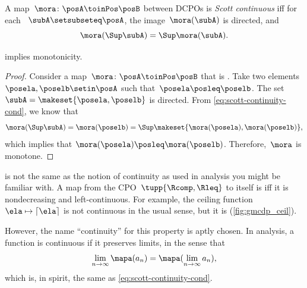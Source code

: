 \begin{ctdefinition}
    \label{def:scott-continuity}
    A map~$\mora\colon\posA\toinPos\posB$ between DCPOs is \emph{Scott continuous} iff for each ~$\subA\setsubseteq\posA$, the image~$\mora(\subA)$ is directed, and
    \begin{equation}
        \label{eq:scott-continuity-cond}
        \mora(\Sup \subA)=\Sup \mora(\subA).
    \end{equation}
\end{ctdefinition}
\begin{lemma}
     implies monotonicity.
\end{lemma}
\begin{proof}
    Consider a map~$\mora\colon\posA\toinPos\posB$ that is .
    Take two elements~$\posela, \poselb \setin \posA$ such that~$\posela\posleq\poselb$.
    The set~$ \subA = \makeset{\posela, \poselb}$ is directed.
    From \cref{eq:scott-continuity-cond}, we know that
    \begin{equation}
        \mora(\Sup \subA) = \mora(\poselb) = \Sup \makeset{\mora(\posela), \mora(\poselb)},
    \end{equation}
    which implies that $\mora(\posela) \posleq \mora(\poselb)$.
    Therefore,~$\mora$ is monotone.
\end{proof}

\begin{marginfigure}
    \caption{The ceiling function is Scott continuous.}
    \label{fig:gmcdp_ceil}
\end{marginfigure}

\begin{remark}
     is not the same as the notion of continuity as used in analysis you might be familiar with.
    A map from the CPO~$\tupp{\Rcomp,{{\Rleq}}}$ to itself is  iff it is nondecreasing and left-continuous.
    For example, the ceiling function~$\ela \mapsto\left\lceil \ela\right\rceil $ is not continuous in the usual sense, but it is  (\cref{fig:gmcdp_ceil}).

    However, the name ``continuity'' for this property is aptly chosen.
    In analysis, a function is continuous if it preserves limits, in the sense that
    \begin{equation}
        \lim_{n\to\infty}\mapa(a_n) = \mapa(\lim_{n\to\infty}a_n),
    \end{equation}
    which is, in spirit, the same as \cref{eq:scott-continuity-cond}.
\end{remark}


